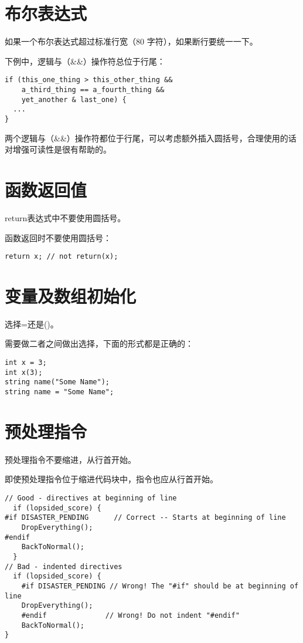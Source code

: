 \section{布尔表达式}
如果一个布尔表达式超过标准行宽（80 字符），如果断行要统一一下。

下例中，逻辑与（\&\&）操作符总位于行尾：
\begin{verbatim}
if (this_one_thing > this_other_thing &&
    a_third_thing == a_fourth_thing &&
    yet_another & last_one) {
  ...
}
\end{verbatim}
两个逻辑与（\&\&）操作符都位于行尾，可以考虑额外插入圆括号，合理使用的话对增强可读性是很有帮助的。


\section{函数返回值}
return表达式中不要使用圆括号。

函数返回时不要使用圆括号：
\begin{verbatim}
return x; // not return(x);
\end{verbatim}


\section{变量及数组初始化}
选择=还是()。

需要做二者之间做出选择，下面的形式都是正确的：
\begin{verbatim}
int x = 3;
int x(3);
string name("Some Name");
string name = "Some Name";
\end{verbatim}


\section{预处理指令}
预处理指令不要缩进，从行首开始。

即使预处理指令位于缩进代码块中，指令也应从行首开始。
\begin{verbatim}
// Good - directives at beginning of line
  if (lopsided_score) {
#if DISASTER_PENDING      // Correct -- Starts at beginning of line
    DropEverything();
#endif
    BackToNormal();
  }
// Bad - indented directives
  if (lopsided_score) {
    #if DISASTER_PENDING // Wrong! The "#if" should be at beginning of
line
    DropEverything();
    #endif              // Wrong! Do not indent "#endif"
    BackToNormal();
}
\end{verbatim}


